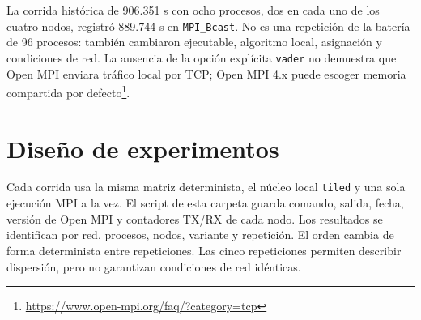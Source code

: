 \documentclass[11pt,a4paper]{article}
\begin{document}
La corrida histórica de 906.351 s con ocho procesos, dos en cada uno de los cuatro nodos, registró 889.744 s en \texttt{MPI\_Bcast}. No es una repetición de la batería de 96 procesos: también cambiaron ejecutable, algoritmo local, asignación y condiciones de red. La ausencia de la opción explícita \texttt{vader} no demuestra que Open MPI enviara tráfico local por TCP; Open MPI 4.x puede escoger memoria compartida por defecto\footnote{\url{https://www.open-mpi.org/faq/?category=tcp}}.

\section{Diseño de experimentos}
Cada corrida usa la misma matriz determinista, el núcleo local \texttt{tiled} y una sola ejecución MPI a la vez. El script de esta carpeta guarda comando, salida, fecha, versión de Open MPI y contadores TX/RX de cada nodo. Los resultados se identifican por red, procesos, nodos, variante y repetición. El orden cambia de forma determinista entre repeticiones. Las cinco repeticiones permiten describir dispersión, pero no garantizan condiciones de red idénticas.
\end{document}

